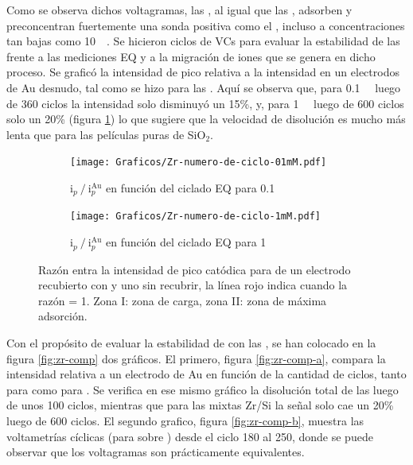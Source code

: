 		 Como se observa dichos voltagramas, las \pdmZ, al igual que las \pdmF, adsorben y preconcentran fuertemente una sonda positiva como el \ru,	incluso a concentraciones tan bajas como \SI{10}{\micro\Molar}. Se hicieron ciclos de VCs para evaluar la estabilidad de las \pdmZ\space frente a las mediciones EQ y a la migración de iones que se genera en dicho proceso. Se graficó la intensidad de pico relativa a la intensidad en un electrodos de Au desnudo, tal como se hizo para las \pdmF. Aquí se observa que, para \ru\space \SI{0.1}{\milli\Molar} luego de 360 ciclos la intensidad solo disminuyó un 15\%, y, para \ru\space \SI{1}{\milli\Molar} luego de 600 ciclos solo un 20\% (figura \ref{fig:ventana-zr}) lo que sugiere que la velocidad de disolución es mucho más lenta que para las películas puras de SiO$_2$.

		 			\begin{figure}[th]
			   	    \begin{subfigure}[t]{0.495\textwidth}
			        	\texttt{[image: Graficos/Zr-numero-de-ciclo-01mM.pdf]}
			        	\vspace*{-6mm}\caption{$\text{i}_p\mathbin{/}\text{i}_p^{\text{Au}}$ en función del ciclado EQ para \ru\space \SI{0.1}{\milli\Molar}}
			         	\end{subfigure}
			     		 \begin{subfigure}[t]{0.495\textwidth}
			        	\texttt{[image: Graficos/Zr-numero-de-ciclo-1mM.pdf]}
			        	\vspace*{-6mm	}\caption{$\text{i}_p\mathbin{/}\text{i}_p^{\text{Au}}$ en función del ciclado EQ para \ru\space \SI{1}{\milli\Molar}}
			         	\end{subfigure}
			         	\caption[Intensidad en función del ciclado EQ para \pdmZ]{Razón entra la intensidad de pico catódica para \ru\space de un electrodo recubierto con \pdmZ\space y uno sin recubrir, la línea rojo indica cuando la razón = 1. Zona I: zona de carga, zona II: zona de máxima adsorción.}
			         	\label{fig:ventana-zr}
			     	\end{figure}
			     		
		 Con el propósito de evaluar la estabilidad de \pdmZ\space con las \pdmF, se han colocado en la figura \ref{fig:zr-comp} dos gráficos. El primero, figura \ref{fig:zr-comp-a}, compara la intensidad relativa a un electrodo de Au en función de la cantidad de ciclos, tanto para \pdmZ\space como para \pdmF. Se verifica en ese mismo gráfico la disolución total de las \pdmF\space luego de unos 100 ciclos, mientras que para las mixtas Zr/Si la señal solo cae un 20\% luego de 600 ciclos. El segundo grafico, figura \ref{fig:zr-comp-b}, muestra las voltametrías cíclicas (para \ru\space sobre \pdmZ) desde el ciclo 180 al 250, donde se puede observar que los voltagramas son prácticamente equivalentes.

